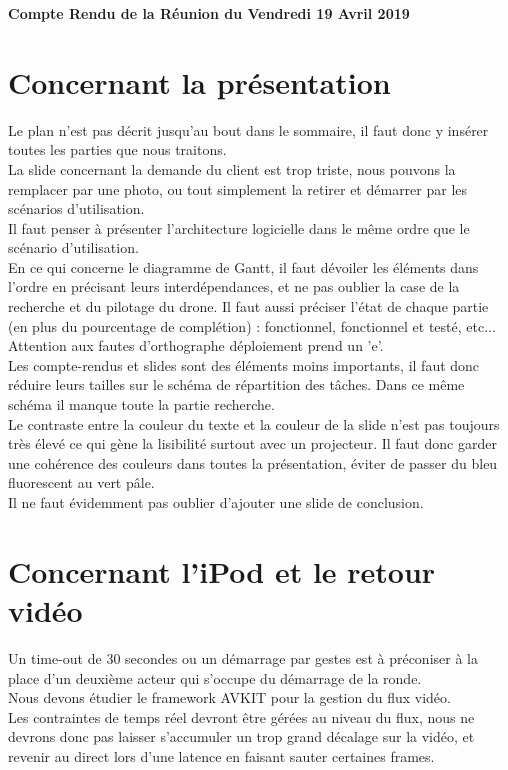 \documentclass[]{article}
\begin{document}
\pagestyle{fancy}
\renewcommand\headrulewidth{1pt}
\renewcommand\footrulewidth{1pt}

\begin{center}
\large{\textbf{Compte Rendu de la Réunion du Vendredi 19 Avril 2019 \bigbreak}}
\end{center}

\section{Concernant la présentation}
Le plan n'est pas décrit jusqu'au bout dans le sommaire, il faut donc y insérer toutes les parties que nous traitons.\\
La slide concernant la demande du client est trop triste, nous pouvons la remplacer par une photo, ou tout simplement la retirer et démarrer par les scénarios d'utilisation.\\
Il faut penser à présenter l'architecture logicielle dans le même ordre que le scénario d'utilisation.\\
En ce qui concerne le diagramme de Gantt, il faut dévoiler les éléments dans l'ordre en précisant leurs interdépendances, et ne pas oublier la case de la recherche et du pilotage du drone. Il faut aussi préciser l'état de chaque partie (en plus du pourcentage de complétion) : fonctionnel, fonctionnel et testé, etc...\\
Attention aux fautes d'orthographe déploiement prend un 'e'.\\
Les compte-rendus et slides sont des éléments moins importants, il faut donc réduire leurs tailles sur le schéma de répartition des tâches. Dans ce même schéma il manque toute la partie recherche.\\
Le contraste entre la couleur du texte et la couleur de la slide n'est pas toujours très élevé ce qui gène la lisibilité surtout avec un projecteur.
Il faut donc garder une cohérence des couleurs dans toutes la présentation, éviter de passer du bleu fluorescent au vert pâle.\\
Il ne faut évidemment pas oublier d'ajouter une slide de conclusion.

\section{Concernant l'iPod et le retour vidéo}
Un time-out de 30 secondes ou un démarrage par gestes est à préconiser à la place d'un deuxième acteur qui s'occupe du démarrage de la ronde.\\
Nous devons étudier le framework AVKIT pour la gestion du flux vidéo.\\
Les contraintes de temps réel devront être gérées au niveau du flux, nous ne devrons donc pas laisser s'accumuler un trop grand décalage sur la vidéo, et revenir au direct lors d'une latence en faisant sauter certaines frames.\\
\end{document}
